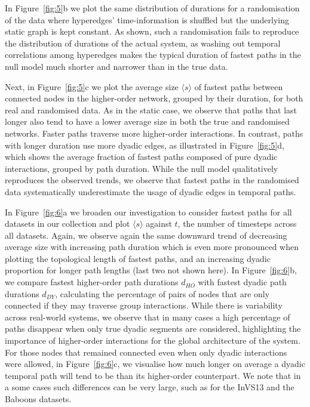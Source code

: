 \documentclass[a4paper,pre,reqno,superscriptaddress, twocolumn, floatfix]{revtex4}
\def\ho{higher-order }
\begin{document}
In Figure~\ref{fig:5}b we plot the same distribution of durations for a randomisation of the data where hyperedges' time-information is shuffled but the underlying static graph is kept constant. 
As shown, such a randomisation fails to reproduce the distribution of durations of the actual system, as washing out temporal correlations among hyperedges makes the typical duration of fastest paths in the null model much shorter and narrower than in the true data.

Next, in Figure~\ref{fig:5}c we plot the average size $\langle{s}\rangle$ of fastest paths between connected nodes in the \ho network, grouped by their duration, for both real and randomised data. 
As in the static case, we observe that paths that last longer also tend to have a lower average size in both the true and randomised networks. 
Faster paths traverse more \ho interactions. In contrast, paths with longer duration use more dyadic edges, as illustrated in Figure~\ref{fig:5}d, which shows the average fraction of fastest paths composed of pure dyadic interactions, grouped by path duration. 
While the null model qualitatively reproduces the observed trends, we observe that fastest paths in the randomised data systematically underestimate the usage of dyadic edges in temporal paths. 

In Figure~\ref{fig:6}a we broaden our investigation to consider fastest paths for all datasets in our collection and plot $\langle{s}\rangle$ against $t$, the number of timesteps across all datasets. Again, we observe again the same downward trend of decreasing average size with increasing path duration which is even more pronounced when plotting the topological length of fastest paths, and an increasing dyadic proportion for longer path lengths (last two not shown here). In Figure~\ref{fig:6}b, we compare fastest \ho path durations $d_{HO}$ with fastest dyadic path durations $d_{DY}$, calculating the percentage of pairs of nodes that are only connected if they may traverse group interactions. While there is variability across real-world systems, we observe that in many cases a high percentage of paths disappear when only true dyadic segments are considered, highlighting the importance of \ho interactions for the global architecture of the system. 
For those nodes that remained connected even when only dyadic interactions were allowed, in Figure~\ref{fig:6}c, we visualise how much longer on average a dyadic temporal path will tend to be than its \ho counterpart. We note that in a some cases such differences can be very large, such as for the InVS13 and the Baboons datasets. 
\end{document}
